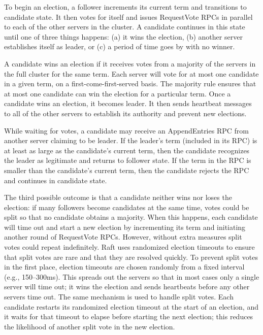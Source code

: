 \documentclass[12pt,letterpaper]{article}
\begin{document}
To begin an election, a follower increments its current term and transitions to candidate state. It then votes for itself and issues RequestVote RPCs in parallel to each of the other servers in the cluster. A candidate continues in this state until one of three things happens: (a) it wins the election, (b) another server establishes itself as leader, or (c) a period of time goes by with no winner.

A candidate wins an election if it receives votes from a majority of the servers in the full cluster for the same term. Each server will vote for at most one candidate in a given term, on a first-come-first-served basis. The majority rule ensures that at most one candidate can win the election for a particular term. Once a candidate wins an election, it becomes leader. It then sends heartbeat messages to all of the other servers to establish its authority and prevent new elections.

While waiting for votes, a candidate may receive an AppendEntries RPC from another server claiming to be leader. If the leader’s term (included in its RPC) is at least as large as the candidate’s current term, then the candidate recognizes the leader as legitimate and returns to follower state. If the term in the RPC is smaller than the candidate’s current term, then the candidate rejects the RPC and continues in candidate state.

The third possible outcome is that a candidate neither wins nor loses the election: if many followers become candidates at the same time, votes could be split so that no candidate obtains a majority. When this happens, each candidate will time out and start a new election by incrementing its term and initiating another round of RequestVote RPCs. However, without extra measures split votes could repeat indefinitely.
Raft uses randomized election timeouts to ensure that split votes are rare and that they are resolved quickly. To prevent split votes in the first place, election timeouts are chosen randomly from a fixed interval (e.g., 150–300ms). This spreads out the servers so that in most cases only a single server will time out; it wins the election and sends heartbeats before any other servers time out. The same mechanism is used to handle split votes. Each candidate restarts its randomized election timeout at the start of an election, and it waits for that timeout to elapse before starting the next election; this reduces the likelihood of another split vote in the new election.
\end{document}
